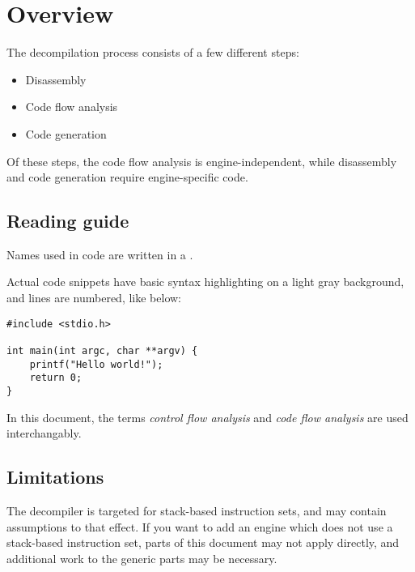 \section{Overview}
The decompilation process consists of a few different steps:

\begin{itemize}
\item Disassembly
\item Code flow analysis
\item Code generation
\end{itemize}

Of these steps, the code flow analysis is engine-independent, while disassembly and code generation require engine-specific code.

\subsection{Reading guide}
Names used in code are written in a .

Actual code snippets have basic syntax highlighting on a light gray background, and lines are numbered, like below:

\begin{C++}
\begin{lstlisting}
#include <stdio.h>

int main(int argc, char **argv) {
	printf("Hello world!");
	return 0;
}
\end{lstlisting}
\end{C++}

In this document, the terms \emph{control flow analysis} and \emph{code flow analysis} are used interchangably.

\subsection{Limitations}
The decompiler is targeted for stack-based instruction sets, and may contain assumptions to that effect. If you want to add an engine which does not use a stack-based instruction set, parts of this document may not apply directly, and additional work to the generic parts may be necessary.
